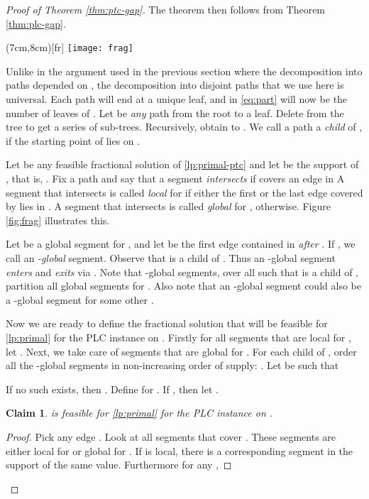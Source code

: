 \documentclass[11pt]{article}
\newtheorem{claim}{Claim}
\newcommand{\1}{\mathbb{1}}
\begin{document}
{\begin{proof}[Proof of Theorem \ref{thm:ptc-gap}]
  The theorem then follows from Theorem \ref{thm:plc-gap}.
  
  \piccaptioninside


  \parpic(7cm,8cm)[fr]{
   \texttt{[image: frag]}}

  Unlike in the argument used in the previous section where the
  decomposition into paths depended on , the decomposition into
  disjoint paths that we use here is universal.  Each path  will
  end at a unique leaf, and  in \eqref{eq:part} will now be the
  number of leaves of . Let  be {\em any} path from the root
  to a leaf. Delete  from the tree to get a series of sub-trees.
  Recursively, obtain  to . We call a path  a {\em
    child} of , if the starting point of  lies on .

  Let  be any feasible fractional solution of \eqref{lp:primal-ptc}
  and let  be the support of , that is, .  Fix a path  and say that a segment  {\em
    intersects}  if  covers an edge in  
A segment  that intersects  is called {\em local} for 
  if either the first or the last edge covered by  lies in .
  A segment  that intersects  is called {\em global} for
  , otherwise. Figure \ref{fig:frag} illustrates this.

  Let  be a global segment for , and let  be the
  first edge contained in  {\em after} .  If , we
  call  an {\em -global} segment. Observe that  is a child
  of .  Thus an -global segment {\em enters}  and {\em
    exits} via .  Note that -global segments, over all  such that  is a child of ,
  partition all global segments for . Also note that an
  -global segment could also be a -global segment for some
  other .

  Now we are ready to define the fractional solution  that
  will be feasible for \eqref{lp:primal} for the PLC instance on
  .  Firstly for all segments  that are local for , let
  . Next, we take care of segments that are global
  for .  For each child  of , order all the -global
  segments in non-increasing order of supply: .
  Let  be such that
  
  If no such  exists, then .  Define 
  for . If , then let .

\begin{claim}
   is feasible for \eqref{lp:primal} for the PLC instance on .
\end{claim}
\begin{proof}
  Pick any edge . Look at all segments  that
  cover . These segments are either local for  or global for
  . If  is local, there is a corresponding segment in the
  support  of the same value. Furthermore for any ,
  

\end{proof}
\end{proof}}
\end{document}
